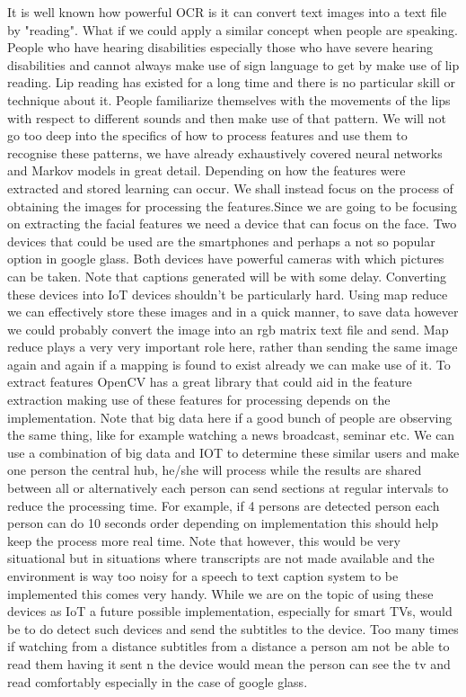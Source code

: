 \documentclass[sigconf]{acmart}
\begin{document}
It is well known how powerful OCR is it can convert text images into a text file by "reading". What if we could apply a similar concept when people are speaking. People who have hearing disabilities especially those who have severe hearing disabilities and cannot always make use of sign language to get by make use of lip reading. Lip reading has existed for a long time and there is no particular skill or technique about it. People familiarize themselves with the movements of the lips with respect to different sounds and then make use of that pattern. We will not go too deep into the specifics of how to process features and use them to recognise these patterns, we have already exhaustively covered neural networks and Markov models in great detail. Depending on how the features were extracted and stored learning can occur. We shall instead focus on the process of obtaining the images for processing the features.Since we are going to be focusing on extracting the facial features we need a device that can focus on the face. Two devices that could be used are the smartphones and perhaps a not so popular option in google glass. Both devices have powerful cameras with which pictures can be taken. Note that captions generated will be with some delay. Converting these devices into IoT devices shouldn't be particularly hard. Using map reduce we can effectively store these images and in a quick manner, to save data however we could probably convert the image into an rgb matrix text file and send. Map reduce plays a very very important role here, rather than sending the same image again and again if a mapping is found to exist already we can make use of it. To extract features OpenCV has a great library that could aid in the feature extraction making use of these features for processing depends on the implementation. Note that big data here if a good bunch of people are observing the same thing, like for example watching a news broadcast, seminar etc. We can use a combination of big data and IOT to determine these similar users and make one person the central hub, he/she will process while the results are shared between all or alternatively each person can send sections at regular intervals to reduce the processing time. For example, if 4 persons are detected person each person can do 10 seconds order depending on implementation this should help keep the process more real time. Note that however, this would be very situational but in situations where transcripts are not made available and the environment is way too noisy for a speech to text caption system to be implemented this comes very handy. While we are on the topic of using these devices as IoT a future possible implementation, especially for smart TVs, would be to do detect such devices and send the subtitles to the device. Too many times if watching from a  distance subtitles from a distance a person am not be able to read them having it sent n the device would mean the person can see the tv and read comfortably especially in the case of google glass.
\end{document}
